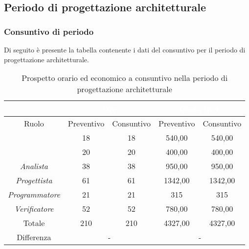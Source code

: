 \subsection{Periodo di progettazione architetturale}\label{ConsuntivoPArchitetturale}
\subsubsection{Consuntivo di periodo}
Di seguito è presente la tabella contenente i dati del consuntivo per il periodo di progettazione architetturale.
\begin{table}[H]
	\centering
	\begin{tabular}{|c|c|c|c|c|}
		\rowcolor{darkblue} 
		&\multicolumn{2}{c|}{\textcolor{white}{Ore}}&\multicolumn{2}{c|}{\textcolor{white}{Costo in €}}\\ \hline
		Ruolo			&	Preventivo				&	Consuntivo		&	Preventivo	&	Consuntivo\\ \hline
		{\Responsabile}		&	18					&	18				&	540,00		&	540,00 \\ \hline
		{\Amministratore}	&	20					&	20				&	400,00		&	400,00 \\ \hline
		\textit{Analista}	&	38					&	38				&	950,00		&	950,00 \\ \hline
		\textit{Progettista}& 	61					&	61 				& 	1342,00		&  	1342,00 \\ \hline
		\textit{Programmatore}& 21					& 	21				& 	315			&  	315 \\ \hline
		\textit{Verificatore}&	52					&	52				&	780,00		&	780,00 \\ \hline
		Totale				&	210					&	210				&	4327,00		&	4327,00 \\ \hline
		Differenza			& 	\multicolumn{2}{c|}{-} 			&\multicolumn{2}{c|}{-}\\ \hline
	\end{tabular}
	\caption{Prospetto orario ed economico a consuntivo nella periodo di progettazione architetturale}
\end{table}
